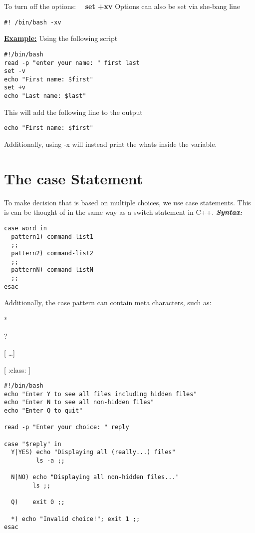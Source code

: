 \documentclass{report}
\begin{document}
To turn off the options: \ \ \textbf{set +xv}
\bigbreak \noindent
Options can also be set via she-bang line \vspace{1.5mm}
\begin{verbatim}
#! /bin/bash -xv
\end{verbatim}
\bigbreak \noindent
\textbf{\underline{Example:}} Using the following script
\begin{verbatim}
#!/bin/bash
read -p "enter your name: " first last
set -v
echo "First name: $first"
set +v
echo "Last name: $last"
\end{verbatim}
This will add the following line to the output
\begin{verbatim}
echo "First name: $first"
\end{verbatim}
Additionally, using -x will instead print the whats inside the variable.
\section{The case Statement}
To make decision that is based on multiple choices, we use case statements. This is can be thought of in the same way as a switch statement in C++.
\bigbreak \noindent
\textit{\textbf{Syntax:}}
\begin{verbatim}
case word in
  pattern1) command-list1
  ;;
  pattern2) command-list2
  ;;
  patternN) command-listN
  ;;
esac
\end{verbatim}
Additionally, the case pattern can contain meta characters, such as: \vspace{1.5mm}

* \vspace{1.5mm}

? \vspace{1.5mm}

[ \ldots ] \vspace{1.5mm}

[ :class: ]
\newline
\begin{mdframed}
\begin{verbatim}
#!/bin/bash
echo "Enter Y to see all files including hidden files"
echo "Enter N to see all non-hidden files"
echo "Enter Q to quit"

read -p "Enter your choice: " reply

case "$reply" in
  Y|YES) echo "Displaying all (really...) files"
         ls -a ;;

  N|NO) echo "Displaying all non-hidden files..."
        ls ;;

  Q)    exit 0 ;;

  *) echo "Invalid choice!"; exit 1 ;;
esac
\end{verbatim}
\end{mdframed}
\end{document}
